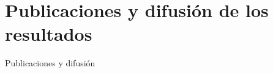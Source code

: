 \chapter{Publicaciones y difusión de los resultados}\label{apendix:ApendicePublicaciones}

Publicaciones y difusión 







